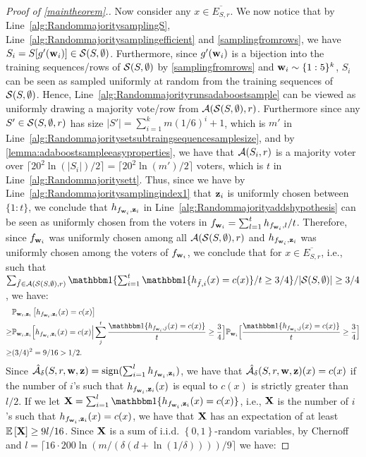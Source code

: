 \begin{proof}[Proof of \cref{maintheorem}.]
Now consider any $x\in \overline{E_{S,r}}$. We now notice that by Line~\ref{alg:RandommajoritysamplingS}, Line~\ref{alg:Randommajoritysamplingefficient} and \cref{samplingfromrows}, we have $S_i=S[g'(\mathbf{w}_{i})]\in\mathcal{S}(S,\emptyset)$. Furthermore, since $g'(\mathbf{w}_{i})$ is a bijection into the training sequences/rows of $\mathcal{S}(S,\emptyset)$ by \cref{samplingfromrows} and $ \mathbf{w}_{i} \sim \{ 1:5 \}^{k}$, $ S_{i} $ can be seen as sampled uniformly at random from the training sequences of $ \mathcal{S}(S,\emptyset) $. Hence, Line~\ref{alg:Randommajorityrunsadaboostsample} can be viewed as uniformly drawing a majority vote/row from $\mathcal{A}(\mathcal{S}(S,\emptyset),r)$. Furthermore since any $ S'\in \mathcal{S}(S,\emptyset,r) $ has size $ |S'|=\sum_{i=1}^{k}m(1/6)^{i}+1$, which is $ m' $ in Line~\ref{alg:Randommajoritysetsubtraingsequencesamplesize}, and by \cref{lemma:adaboostsampleeasyproperties}, we have that  $ \mathcal{A}(S_{i},r) $ is a majority voter over $ \lceil20^{2}\ln{(|S_{i}|)}/2 \rceil=\lceil20^{2}\ln{(m')}/2 \rceil $ voters, which is $ t $ in Line~\ref{alg:Randommajoritysett}.  
Thus, since we have by Line~\ref{alg:Randommajoritysamplingindex1} that $\mathbf{z}_{i}$ is uniformly chosen between $\{ 1:t \}$, we conclude that $h_{f_{\mathbf{w}_{i}},\mathbf{z}_{i}}$ in Line~\ref{alg:Randommajorityaddshypothesis} can be seen as uniformly chosen from the voters in $ f_{\mathbf{w}_{i}} =\sum_{l=1}^{t}h_{f_{\mathbf{w}_{i}},l}/t$. Therefore, since $ f_{\mathbf{w}_{i}} $ was uniformly chosen among all $ \mathcal{A}(\mathcal{S}(S,\emptyset),r) $ and $ h_{f_{\mathbf{w}_{i}},\mathbf{z}_{i}} $ was uniformly chosen among the voters of $ f_{\mathbf{w}_{i}} $, we conclude that for $x\in \overline{E_{S,r}}$, i.e., such that $\sum_{\tilde{f}\in \cA(\cS(S,\emptyset),r)} \ind\{\sum_{i=1}^{t} \ind\{h_{\tilde{f},i}(x)=c(x)\}/t\geq 3/4\}/|\cS(S,\emptyset)|\geq3/4 $, we have:
   \begin{align*}
    &\p_{\rw_{i},\rz_{i}}\left[h_{f_{\rw_{i}},\rz_{i}}(x)=c(x)\right]\\
    \geq
    &\p_{\rw_{i},\rz_{i}}\Big[h_{f_{\rw_{i}},\rz_{i}}(x)=c(x)\Big| \sum_{j}^{t} \frac{\ind\{h_{f_{\rw_{i}},j}(x)=c(x)\}}{t}\geq \frac{3}{4}\Big] \p_{\rw_{i}}\Big[\frac{\ind\{h_{f_{\rw_{i}},j}(x)=c(x)\}}{t}\geq \frac{3}{4}\Big]\\
    \geq& 
    (3/4)^{2}=9/16>1/2.
   \end{align*}
Since $\mathcal{\hat{A}}_{\delta}(S,r,\mathbf{w},\mathbf{z})=\operatorname{sign}(\sum_{i=1}^{l}  h_{f_{\mathbf{w}_{i}},\mathbf{z}_{i}})$, we have that $\mathcal{\hat{A}}_{\delta}(S,r,\mathbf{w},\mathbf{z})(x)=c(x)$ if the number of $i$'s such that $h_{f_{\mathbf{w}_{i}},\mathbf{z}_{i}}(x)$ is equal to $c(x)$ is strictly greater than $l/2$. If we let $\rX= \sum_{i=1}^{l}\ind\{h_{f_{\rw_{i}},\rz_{i}}(x)=c(x)\}$, i.e., $\mathbf{X}$ is the number of $ i $'s such that $h_{f_{\mathbf{w}_{i}},\mathbf{z}_{i}}(x)=c(x)$, we have that $\mathbf{X}$ has an expectation of at least  $\mathbb{E}\left[\mathbf{X}\right]\geq 9l/16$. Since $ \mathbf{X} $ is a sum of i.i.d. $\left\{ 0,1 \right\}$-random variables, by Chernoff and $l=\lceil 16\cdot200 \ln{(m/(\delta(d+\ln{(1/\delta )})) )}/9 \rceil$ we have:

\end{proof}

